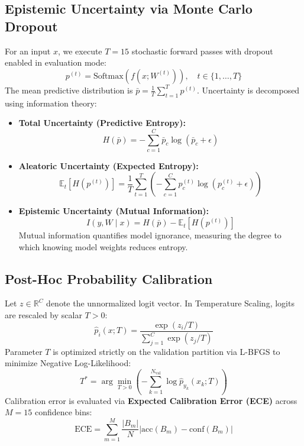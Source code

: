 \documentclass[11pt,a4paper]{article}
\begin{document}
\subsection{Epistemic Uncertainty via Monte Carlo Dropout}
For an input $x$, we execute $T = 15$ stochastic forward passes with dropout enabled in evaluation mode:
\begin{equation}
    p^{(t)} = \mathrm{Softmax}\left( f\left(x; W^{(t)}\right) \right), \quad t \in \{1, \dots, T\}
\end{equation}
The mean predictive distribution is $\bar{p} = \frac{1}{T} \sum_{t=1}^T p^{(t)}$. Uncertainty is decomposed using information theory:
\begin{itemize}[leftmargin=*]
    \item \textbf{Total Uncertainty (Predictive Entropy):}
    \begin{equation}
        H(\bar{p}) = -\sum_{c=1}^C \bar{p}_c \log \left(\bar{p}_c + \epsilon\right)
    \end{equation}
    \item \textbf{Aleatoric Uncertainty (Expected Entropy):}
    \begin{equation}
        \mathbb{E}_t\left[ H\left(p^{(t)}\right) \right] = \frac{1}{T} \sum_{t=1}^T \left( -\sum_{c=1}^C p_c^{(t)} \log \left(p_c^{(t)} + \epsilon\right) \right)
    \end{equation}
    \item \textbf{Epistemic Uncertainty (Mutual Information):}
    \begin{equation}
        I(y, W \mid x) = H(\bar{p}) - \mathbb{E}_t\left[ H\left(p^{(t)}\right) \right]
    \end{equation}
    Mutual information quantifies model ignorance, measuring the degree to which knowing model weights reduces entropy.
\end{itemize}

\subsection{Post-Hoc Probability Calibration}
Let $z \in \mathbb{R}^C$ denote the unnormalized logit vector. In Temperature Scaling, logits are rescaled by scalar $T > 0$:
\begin{equation}
    \hat{p}_i(x; T) = \frac{\exp(z_i / T)}{\sum_{j=1}^C \exp(z_j / T)}
\end{equation}
Parameter $T$ is optimized strictly on the validation partition via L-BFGS to minimize Negative Log-Likelihood:
\begin{equation}
    T^* = \arg\min_{T > 0} \left( -\sum_{k=1}^{N_{\text{val}}} \log \hat{p}_{y_k}\left(x_k; T\right) \right)
\end{equation}
Calibration error is evaluated via \textbf{Expected Calibration Error (ECE)} across $M = 15$ confidence bins:
\begin{equation}
    \text{ECE} = \sum_{m=1}^M \frac{|B_m|}{N} \left| \mathrm{acc}(B_m) - \mathrm{conf}(B_m) \right|
\end{equation}
\end{document}
